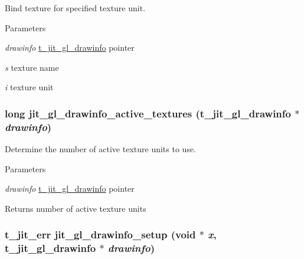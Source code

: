 Bind texture for specified texture unit. 
\begin{DoxyParams}{Parameters}
\item[{\em drawinfo}]\hyperlink{structt__jit__gl__drawinfo}{t\_\-jit\_\-gl\_\-drawinfo} pointer \item[{\em s}]texture name \item[{\em i}]texture unit \end{DoxyParams}
\hypertarget{group__ob3dmod_gafebfd86239675c14e3a78a49b5a78e92}{
\subsubsection[{jit\_\-gl\_\-drawinfo\_\-active\_\-textures}]{\setlength{\rightskip}{0pt plus 5cm}long jit\_\-gl\_\-drawinfo\_\-active\_\-textures ({\bf t\_\-jit\_\-gl\_\-drawinfo} $\ast$ {\em drawinfo})}}
\label{group__ob3dmod_gafebfd86239675c14e3a78a49b5a78e92}


Determine the number of active texture units to use. 
\begin{DoxyParams}{Parameters}
\item[{\em drawinfo}]\hyperlink{structt__jit__gl__drawinfo}{t\_\-jit\_\-gl\_\-drawinfo} pointer\end{DoxyParams}
\begin{DoxyReturn}{Returns}
number of active texture units 
\end{DoxyReturn}
\hypertarget{group__ob3dmod_ga6b42cd2b3e58ff2c13d38b4bde52668d}{
\subsubsection[{jit\_\-gl\_\-drawinfo\_\-setup}]{\setlength{\rightskip}{0pt plus 5cm}t\_\-jit\_\-err jit\_\-gl\_\-drawinfo\_\-setup (void $\ast$ {\em x}, \/  {\bf t\_\-jit\_\-gl\_\-drawinfo} $\ast$ {\em drawinfo})}}
\label{group__ob3dmod_ga6b42cd2b3e58ff2c13d38b4bde52668d}


